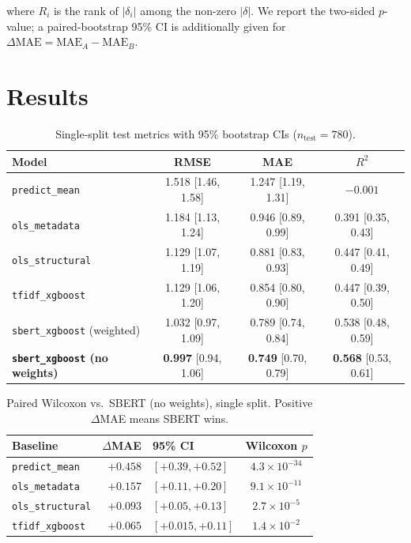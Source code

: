 \documentclass[runningheads]{llncs}
\begin{document}
where $R_{i}$ is the rank of $\lvert \delta_{i} \rvert$ among the
non-zero $\lvert \delta \rvert$. We report the two-sided
$p$-value; a paired-bootstrap 95\% CI is additionally given for
$\Delta\text{MAE} = \mathrm{MAE}_{A} - \mathrm{MAE}_{B}$.

\section{Results}\label{sec:results}

\begin{table}[t]
\caption{Single-split test metrics with 95\% bootstrap CIs
($n_{\text{test}} = 780$).}\label{tab:single}
\centering
\begin{tabular}{@{}lccc@{}}
\toprule
Model & RMSE & MAE & $R^{2}$ \\
\midrule
\texttt{predict\_mean}             & 1.518 [1.46, 1.58] & 1.247 [1.19, 1.31] & $-0.001$ \\
\texttt{ols\_metadata}             & 1.184 [1.13, 1.24] & 0.946 [0.89, 0.99] & 0.391 [0.35, 0.43] \\
\texttt{ols\_structural}           & 1.129 [1.07, 1.19] & 0.881 [0.83, 0.93] & 0.447 [0.41, 0.49] \\
\texttt{tfidf\_xgboost}            & 1.129 [1.06, 1.20] & 0.854 [0.80, 0.90] & 0.447 [0.39, 0.50] \\
\texttt{sbert\_xgboost} (weighted) & 1.032 [0.97, 1.09] & 0.789 [0.74, 0.84] & 0.538 [0.48, 0.59] \\
\textbf{\texttt{sbert\_xgboost} (no weights)}
& \textbf{0.997} [0.94, 1.06] & \textbf{0.749} [0.70, 0.79] & \textbf{0.568} [0.53, 0.61] \\
\bottomrule
\end{tabular}
\end{table}

\begin{table}[t]
\caption{Paired Wilcoxon vs.\ SBERT (no weights), single split.
Positive $\Delta$MAE means SBERT wins.}\label{tab:paired-single}
\centering
\begin{tabular}{@{}lrlc@{}}
\toprule
Baseline & $\Delta$MAE & 95\% CI & Wilcoxon $p$ \\
\midrule
\texttt{predict\_mean}   & $+0.458$ & $[+0.39, +0.52]$  & $4.3\!\times\!10^{-34}$ \\
\texttt{ols\_metadata}   & $+0.157$ & $[+0.11, +0.20]$  & $9.1\!\times\!10^{-11}$ \\
\texttt{ols\_structural} & $+0.093$ & $[+0.05, +0.13]$  & $2.7\!\times\!10^{-5}$ \\
\texttt{tfidf\_xgboost}  & $+0.065$ & $[+0.015, +0.11]$ & $1.4\!\times\!10^{-2}$ \\
\bottomrule
\end{tabular}
\end{table}
\end{document}
